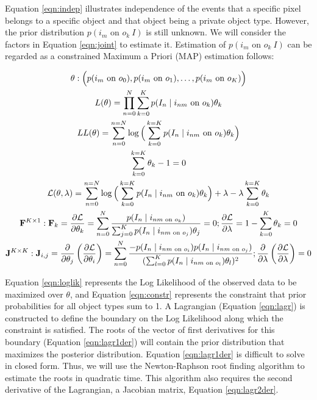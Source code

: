 \documentclass[11pt]{article}
\begin{document}
Equation \ref{eqn:indep} illustrates independence of the events that a specific pixel belongs to a specific object and that object being a private object type.  However, the prior distribution $p(i_m \textrm{ on } o_k \ I)$ is still unknown.  We will consider the factors in Equation \ref{eqn:joint} to estimate it.  Estimation of $p(i_m \textrm{ on } o_k \ I)$ can be regarded as a constrained Maximum a Priori (MAP) estimation follows:


\begin{gather}
	\theta : \Big(p(i_m \textrm{ on } o_0), p(i_m \textrm{ on } o_1),
		\dots, p(i_m \textrm{ on } o_K)\Big) \notag\\
	L(\theta) = \prod_{n=0}^{N} \sum_{k=0}^{K} p(I_n \mid i_{nm} 
		\textrm{ on } o_k) \theta_k \notag\\
	LL(\theta) = \sum_{n=0}^{n=N} \log \Big( \sum_{k=0}^{k=K} 
		p(I_n \mid i_{nm} \textrm{ on } o_k) \theta_k \Big) \label{eqn:loglik}\\
	\sum_{k=0}^{k=K} \theta_k - 1 = 0 \label{eqn:constr}\\
	\mathcal{L}(\theta, \lambda) = \sum_{n=0}^{n=N} \log 
		\Big( \sum_{k=0}^{k=K} p(I_n \mid i_{nm} \textrm{ on } o_k) \theta_k \Big) + \lambda - \lambda \sum_{k=0}^{k=K} \theta_k \label{eqn:lagr}\\
	\mathbf{F}^{K \times 1}: \mathbf{F}_k = \frac{\partial \mathcal{L}}{\partial \theta_k} = 
		\sum_{n=0}^{N} \frac
			{p(I_n \mid i_{nm \textrm{ on } o_k})}
			{\sum_{j=0}^{K} p(I_n \mid i_{nm \textrm{ on } o_j}) \theta_j} = 0;
		\frac{\partial \mathcal{L}}{\partial \lambda} = 1 - \sum_{k=0}^{K} 
			\theta_k = 0 \label{eqn:lagr1der}\\
	\mathbf{J}^{K \times K}: \mathbf{J}_{i,j} = \frac{\partial}{\partial \theta_j} \left( \frac
		{\partial \mathcal{L}}{\partial \theta_i} \right) = 
		\sum_{n=0}^{N} \frac
			{-p(I_n \mid i_{nm \textrm{ on } o_i})p(I_n \mid i_{nm \textrm{ on } o_j})}
			{(\sum_{l=0}^{K} p(I_n \mid i_{nm \textrm{ on } o_l}) \theta_l)^2} \label{eqn:lagr2der};
		\frac{\partial}{\partial \lambda} \left( \frac{\partial \mathcal{L}}{\partial \lambda} \right) = 0
\end{gather}

Equation \ref{eqn:loglik} represents the Log Likelihood of the observed data to be maximized over $\theta$, and Equation \ref{eqn:constr} represents the constraint that prior probabilities for all object types sum to 1.  A Lagrangian (Equation \ref{eqn:lagr}) is constructed to define the boundary on the Log Likelihood along which the constraint is satisfied.  The roots of the vector of first derivatives for this boundary (Equation \ref{eqn:lagr1der}) will contain the prior distribution that maximizes the posterior distribution.  Equation \ref{eqn:lagr1der} is difficult to solve in closed form. Thus, we will use the Newton-Raphson root finding algorithm to estimate the roots in quadratic time.  This algorithm also requires the second derivative of the Lagrangian, a Jacobian matrix, Equation \ref{eqn:lagr2der}.
\end{document}
